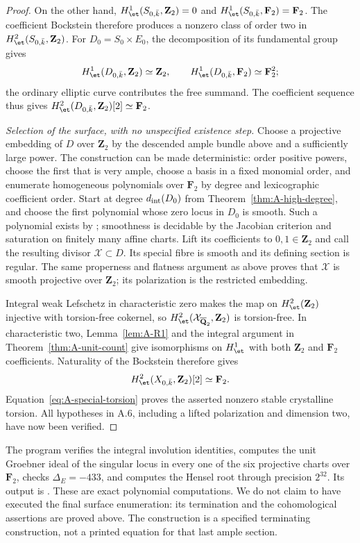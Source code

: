 \begin{proof}
On the other hand,
$H^1_{\et}(S_{0,\bar k},\mathbf Z_2)=0$ and
$H^1_{\et}(S_{0,\bar k},\mathbf F_2)=\mathbf F_2$.
The coefficient Bockstein therefore produces a nonzero class of
order two in $H^2_{\et}(S_{0,\bar k},\mathbf Z_2)$.
For $D_0=S_0\times E_0$, the decomposition of its fundamental group
gives
\[
 H^1_{\et}(D_{0,\bar k},\mathbf Z_2)\simeq\mathbf Z_2,
 \qquad H^1_{\et}(D_{0,\bar k},\mathbf F_2)\simeq\mathbf F_2^2;
\]
the ordinary elliptic curve contributes the free summand.  The
coefficient sequence thus gives
$H^2_{\et}(D_{0,\bar k},\mathbf Z_2)[2]\simeq\mathbf F_2$.

\emph{Selection of the surface, with no unspecified existence step.}
Choose a projective embedding of $D$ over $\mathbf Z_2$ by the
descended ample bundle above and a sufficiently large power.  The
construction can be made deterministic: order positive powers,
choose the first that is very ample, choose a basis in a fixed
monomial order, and enumerate homogeneous polynomials over
$\mathbf F_2$ by degree and lexicographic coefficient order.
Start at degree $d_{\rm int}(D_0)$ from
Theorem~\ref{thm:A-high-degree}, and choose the first polynomial
whose zero locus in $D_0$ is smooth.  Such a polynomial exists by
\citet[Theorem 1.1]{Poonen2004}; smoothness is decidable by the
Jacobian criterion and saturation on finitely many affine charts.
Lift its coefficients to $0,1\in\mathbf Z_2$ and call the resulting
divisor $\mathcal X\subset D$.  Its special fibre is smooth and its
defining section is regular.  The same properness and flatness
argument as above proves that $\mathcal X$ is smooth projective over
$\mathbf Z_2$; its polarization is the restricted embedding.

Integral weak Lefschetz in characteristic zero makes the map on
$H^2_{\et}(\mathbf Z_2)$ injective with torsion-free cokernel, so
$H^2_{\et}(\mathcal X_{\overline{\mathbf Q}_2},\mathbf Z_2)$ is
torsion-free.  In characteristic two,
Lemma~\ref{lem:A-R1} and the integral argument in
Theorem~\ref{thm:A-unit-count} give isomorphisms on $H^1_{\et}$ with
both $\mathbf Z_2$ and $\mathbf F_2$ coefficients.  Naturality of the
Bockstein therefore gives
\[
H^2_{\et}(X_{0,\bar k},\mathbf Z_2)[2]\simeq\mathbf F_2.
\]
Equation~\eqref{eq:A-special-torsion} proves the asserted nonzero
stable crystalline torsion.  All hypotheses in A.6, including a
lifted polarization and dimension two, have now been verified.
\end{proof}

\begin{remark}\label{rem:A-K3-computation}
The program  verifies the integral
involution identities, computes the unit Groebner ideal of the
singular locus in every one of the six projective charts over
$\mathbf F_2$, checks $\Delta_E=-433$, and computes the Hensel root
through precision $2^{32}$.  Its output is
.  These are exact polynomial
computations.  We do not claim to have executed the final surface
enumeration: its termination and the cohomological assertions are
proved above.  The construction is a specified terminating
construction, not a printed equation for that last ample section.
\end{remark}

